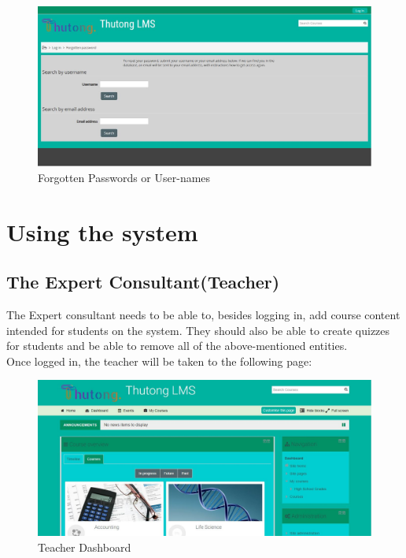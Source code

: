 \documentclass[12pt,a4paper]{article}
\begin{document}
				\begin{figure}[!]
					\centering
					\includegraphics[width=1\textwidth]{images/forgotPassword.JPG}
					\caption{Forgotten Passwords or User-names}
					\label{Figure 5}
				\end{figure}
				 
		
	\section{Using the system}		
		\subsection{The Expert Consultant(Teacher)}
			The Expert consultant needs to be able to, besides logging in, add course content intended for students on the system. They should also be able to create quizzes for students and be able to remove all of the above-mentioned entities.\\Once logged in, the teacher will be taken to the following page:
			
			\begin{figure}[h]
				\centering
				\includegraphics[width=1\textwidth]{images/teacherDash.JPG}
				\caption{Teacher Dashboard}
				\label{Figure 6}
			\end{figure}
\end{document}
